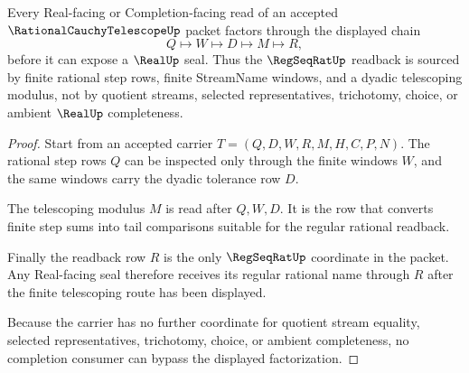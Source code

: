 \begin{theorem}
\label{thm:rational-cauchy-telescope-regseqrat-factorization}
Every Real-facing or Completion-facing read of an accepted $\RationalCauchyTelescopeUp$ packet factors through the displayed chain
$$
Q \longmapsto W \longmapsto D \longmapsto M \longmapsto R,
$$
before it can expose a $\RealUp$ seal. Thus the $\RegSeqRatUp$ readback is sourced by finite rational step rows, finite StreamName windows, and a dyadic telescoping modulus, not by quotient streams, selected representatives, trichotomy, choice, or ambient $\RealUp$ completeness.
\end{theorem}
\begin{proof}
Start from an accepted carrier $T=(Q,D,W,R,M,H,C,P,N)$. The rational step rows $Q$ can be inspected only through the finite windows $W$, and the same windows carry the dyadic tolerance row $D$.

The telescoping modulus $M$ is read after $Q,W,D$. It is the row that converts finite step sums into tail comparisons suitable for the regular rational readback.

Finally the readback row $R$ is the only $\RegSeqRatUp$ coordinate in the packet. Any Real-facing seal therefore receives its regular rational name through $R$ after the finite telescoping route has been displayed.

Because the carrier has no further coordinate for quotient stream equality, selected representatives, trichotomy, choice, or ambient completeness, no completion consumer can bypass the displayed factorization.
\end{proof}

